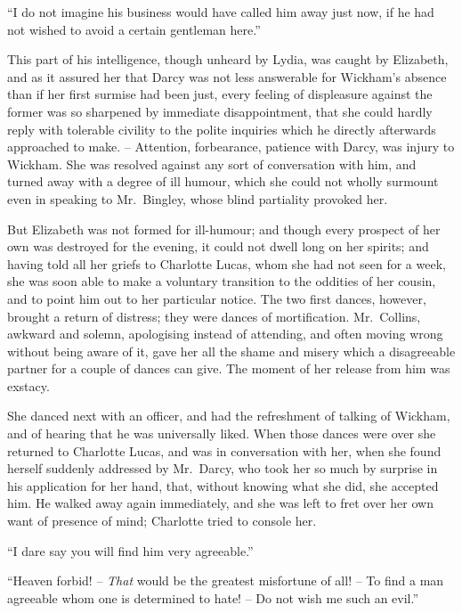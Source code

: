 “I do not imagine his business would have called him
away just now, if he had not wished to avoid a certain
gentleman here.”

This part of his intelligence, though unheard by Lydia,
was caught by Elizabeth, and as it assured her that Darcy
was not less answerable for Wickham’s absence than if her
first surmise had been just, every feeling of displeasure
against the former was so sharpened by immediate disappointment,
that she could hardly reply with tolerable
civility to the polite inquiries which he directly afterwards
approached to make. -- Attention, forbearance, patience
with Darcy, was injury to Wickham. She was resolved
against any sort of conversation with him, and turned
away with a degree of ill humour, which she could not
wholly surmount even in speaking to Mr.\ Bingley, whose
blind partiality provoked her.

But Elizabeth was not formed for ill-humour; and
though every prospect of her own was destroyed for the
evening, it could not dwell long on her spirits; and
having told all her griefs to Charlotte Lucas, whom she
had not seen for a week, she was soon able to make a
voluntary transition to the oddities of her cousin, and
to point him out to her particular notice. The two first
dances, however, brought a return of distress; they were
dances of mortification. Mr.\ Collins, awkward and solemn,
apologising instead of attending, and often moving wrong
without being aware of it, gave her all the shame and
misery which a disagreeable partner for a couple of dances
can give. The moment of her release from him was exstacy.

She danced next with an officer, and had the refreshment
of talking of Wickham, and of hearing that he was
universally liked. When those dances were over she
returned to Charlotte Lucas, and was in conversation
with her, when she found herself suddenly addressed by
Mr.\ Darcy, who took her so much by surprise in his
application for her hand, that, without knowing what she
did, she accepted him. He walked away again immediately,
and she was left to fret over her own want of presence
of mind; Charlotte tried to console her.

“I dare say you will find him very agreeable.”

“Heaven forbid! -- \textit{That} would be the greatest misfortune
of all! -- To find a man agreeable whom one is
determined to hate! -- Do not wish me such an evil.”

